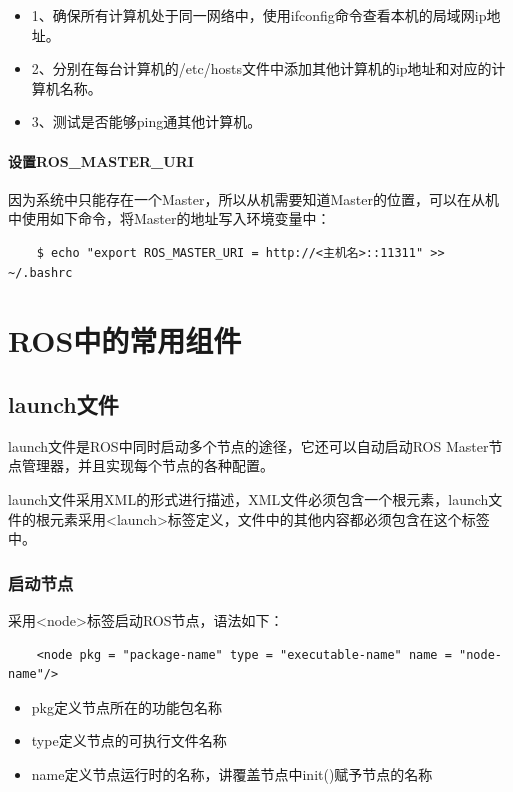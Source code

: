 \documentclass[10pt, oneside]{book}
\begin{document}
\begin{itemize}
    \item 1、确保所有计算机处于同一网络中，使用ifconfig命令查看本机的局域网ip地址。
    \item 2、分别在每台计算机的/etc/hosts文件中添加其他计算机的ip地址和对应的计算机名称。
    \item 3、测试是否能够ping通其他计算机。
\end{itemize}

\subsubsection{设置ROS\_MASTER\_URI}

因为系统中只能存在一个Master，所以从机需要知道Master的位置，可以在从机中使用如下命令，将Master的地址写入环境变量中：

\begin{verbatim}
    $ echo "export ROS_MASTER_URI = http://<主机名>::11311" >> ~/.bashrc
\end{verbatim}


\chapter{ROS中的常用组件}

\section{launch文件}

launch文件是ROS中同时启动多个节点的途径，它还可以自动启动ROS Master节点管理器，并且实现每个节点的各种配置。

launch文件采用XML的形式进行描述，XML文件必须包含一个根元素，launch文件的根元素采用<launch>标签定义，文件中的其他内容都必须包含在这个标签中。

\subsection{启动节点}

采用<node>标签启动ROS节点，语法如下：

\begin{verbatim}
    <node pkg = "package-name" type = "executable-name" name = "node-name"/>
\end{verbatim}

\begin{itemize}
    \item pkg定义节点所在的功能包名称
    \item type定义节点的可执行文件名称
    \item name定义节点运行时的名称，讲覆盖节点中init()赋予节点的名称
\end{itemize}
\end{document}
